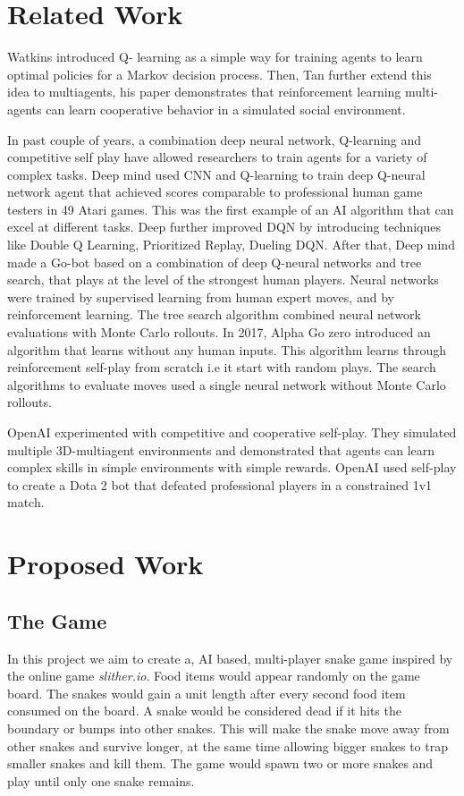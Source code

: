 \documentclass[conference]{IEEEtran}
\begin{document}
\section{Related Work}
Watkins\cite{sp1} introduced Q- learning as a simple way for training agents to learn
optimal policies for a Markov decision process. Then, Tan\cite{sp2} further extend
this idea to multiagents, his paper demonstrates that reinforcement learning
multi-agents can learn cooperative behavior in a simulated social environment.

In past couple of years, a combination deep neural network, Q-learning and
competitive self play have allowed researchers to train agents for a variety
of complex tasks. Deep mind\cite{sp3} used CNN and Q-learning to train deep Q-neural
network agent that achieved scores comparable to professional human game
testers in 49 Atari games. This was the first example of an AI algorithm
that can excel at different tasks. Deep further improved DQN by introducing
techniques like Double Q Learning\cite{sp4}, Prioritized Replay\cite{sp5}, Dueling DQN\cite{sp6}.  After
that, Deep mind made a Go-bot\cite{sp7} based on a combination of deep Q-neural
networks and tree search, that plays at the level of the strongest human
players. Neural networks were trained by supervised learning from human
expert moves, and by reinforcement learning. The tree search algorithm
combined neural network evaluations with Monte Carlo rollouts. In 2017, Alpha
Go zero\cite{sp8} introduced an algorithm that learns without any human inputs.
This algorithm learns through reinforcement self-play from scratch i.e it start
 with random plays. The search algorithms to evaluate moves used a single
 neural network without Monte Carlo rollouts.

OpenAI experimented with competitive and cooperative self-play\cite{sp9}. They simulated
multiple 3D-multiagent environments and demonstrated that agents can learn
complex skills in simple environments with simple rewards. OpenAI\cite{sp10} used
self-play to create a Dota 2 bot that defeated professional players in a
constrained 1v1 match.

\section{Proposed Work}
\subsection{The Game}
In this project we aim to create a, AI based, multi-player snake game inspired
by the online game \textit{slither.io}. Food items would appear randomly on
the game board. The snakes would gain a unit length after every second food
item consumed on the board. A snake would be considered dead if it hits the
boundary or bumps into other snakes. This will make the snake move away from
other snakes and survive longer, at the same time allowing bigger snakes to
trap smaller snakes and kill them. The game would spawn two or more snakes
and play until only one snake remains.\newline\par
\end{document}
